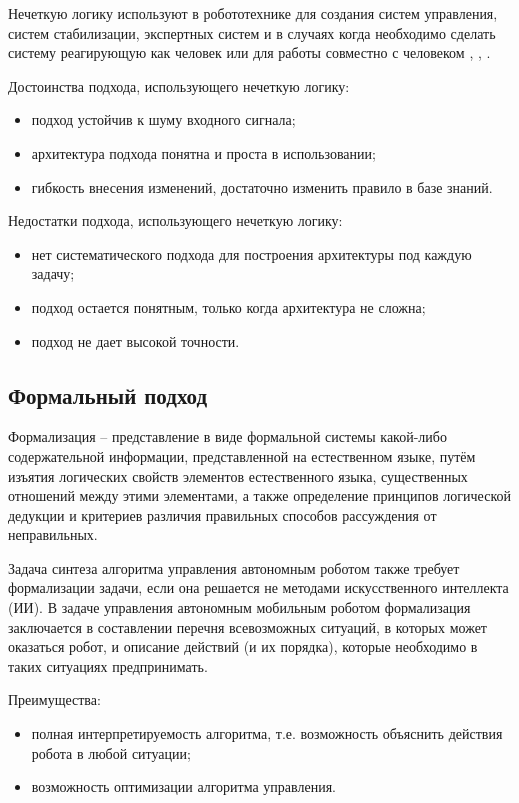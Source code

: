 Нечеткую логику используют в робототехнике для создания систем управления, систем стабилизации, экспертных систем и в случаях когда необходимо сделать систему реагирующую как человек или для работы совместно с человеком \cite{fuzzy1}, \cite{fuzzy2}, \cite{fuzzy3}.

Достоинства подхода, использующего нечеткую логику:
\begin{itemize}
	\item подход устойчив к шуму входного сигнала;
	\item архитектура подхода понятна и проста в использовании;
	\item гибкость внесения изменений, достаточно изменить правило в базе знаний.
\end{itemize}

Недостатки подхода, использующего нечеткую логику:
\begin{itemize}
	\item нет систематического подхода для построения архитектуры под каждую задачу;
	\item подход остается понятным, только когда архитектура не сложна;
	\item подход не дает высокой точности.
\end{itemize}


\subsection{Формальный подход}
Формализация – представление в виде формальной системы какой-либо содержательной информации, представленной на естественном языке, путём изъятия логических свойств элементов естественного языка, существенных отношений между этими элементами, а также определение принципов  логической дедукции и критериев различия правильных способов рассуждения от неправильных.

Задача синтеза алгоритма управления автономным роботом также требует формализации задачи, если она решается не методами искусственного интеллекта (ИИ). 
В задаче управления автономным мобильным роботом формализация заключается в составлении перечня всевозможных ситуаций, в которых может оказаться робот, и описание действий (и их порядка), которые необходимо в таких ситуациях предпринимать. 

Преимущества:
\begin{itemize}
	\item полная интерпретируемость алгоритма, т.е. возможность объяснить действия робота в любой ситуации;
	\item возможность оптимизации алгоритма управления.
\end{itemize}

